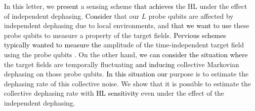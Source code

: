 \documentclass[prl,twocolumn,superscriptaddress]{revtex4}
\begin{document}
In this letter, we
\textcolor{black}{present} a sensing scheme
\textcolor{black}{that achieves}
the HL
under the effect of
 independent dephasing. 
  \textcolor{black}{Consider}
  that our $L$ probe qubits are
 affected by independent dephasing due to local environments,
 and \textcolor{black}{that we want to use}
 these probe qubits to measure a property of the target fields.
 \textcolor{black}{Pervious schemes typically wanted to measure the}
 amplitude of the time-independent target field using the probe qubits
  \cite{huelga1997improvement,shaji2007qubit, matsuzaki2011magnetic,chin2012quantum,macieszczak2015zeno,tanaka2015proposed}.
 On the other hand,
 \textcolor{black}{we can consider the situation where}
 the target fields are
 temporally fluctuating \textcolor{black}{and inducing}
 collective Markovian dephasing on those probe
 qubits. \textcolor{black}{In this situation our }
 purpose is to estimate the dephasing rate of this collective
 noise.
 We show that
 it is possible to estimate the collective dephasing
  rate  with \textcolor{black}{HL sensitivity}
  even under the effect of the independent dephasing.
\end{document}
